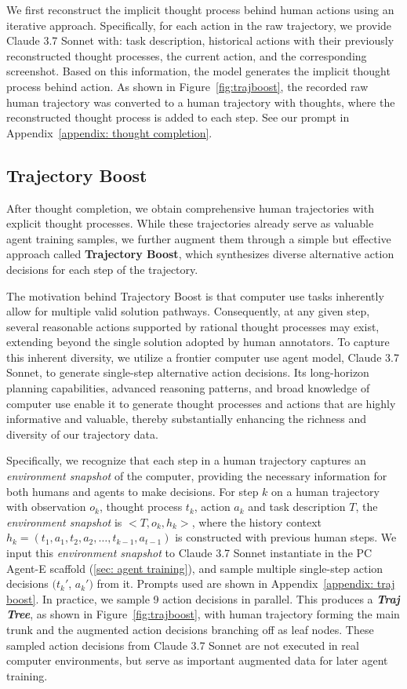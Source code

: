 \documentclass{article} %
\begin{document}
We first reconstruct the implicit thought process behind human actions using an iterative approach. Specifically, for each action in the raw trajectory, we provide Claude 3.7 Sonnet with: task description, historical actions with their previously reconstructed thought processes, the current action, and the corresponding screenshot. Based on this information, the model generates the implicit thought process behind action. As shown in Figure~\ref{fig:trajboost}, the recorded raw human trajectory was converted to a human trajectory with thoughts, where the reconstructed thought process is added to each step. See our prompt in Appendix~\ref{appendix: thought completion}.

\subsection{Trajectory Boost}
\label{sec:trajboost}

After thought completion, we obtain comprehensive human trajectories with explicit thought processes. While these trajectories already serve as valuable agent training samples, we further augment them through a simple but effective approach called \textbf{Trajectory Boost}, which synthesizes diverse alternative action decisions for each step of the trajectory.

The motivation behind Trajectory Boost is that computer use tasks inherently allow for multiple valid solution pathways. Consequently, at any given step, several reasonable actions supported by rational thought processes may exist, extending beyond the single solution adopted by human annotators. To capture this inherent diversity, we utilize a frontier computer use agent model, Claude 3.7 Sonnet, to generate single-step alternative action decisions. Its long-horizon planning capabilities, advanced reasoning patterns, and broad knowledge of computer use enable it to generate thought processes and actions that are highly informative and valuable, thereby substantially enhancing the richness and diversity of our trajectory data.

Specifically, we recognize that each step in a human trajectory captures an \textit{environment snapshot} of the computer, providing the necessary information for both humans and agents to make decisions. For step $k$ on a human trajectory with observation $o_k$, thought process $t_k$, action $a_k$ and task description $T$, the \textit{environment snapshot} is $<T,o_k, h_k>$, where the history context $h_k = (t_1, a_1, t_2, a_2, \dots, t_{k-1}, a_{t-1})$ is constructed with previous human steps. We input this \textit{environment snapshot} to Claude 3.7 Sonnet instantiate in the PC Agent-E scaffold (\autoref{sec: agent training}), and sample multiple single-step action decisions $(t_k'$, $a_k')$ from it. Prompts used are shown in Appendix~\ref{appendix: traj boost}. In practice, we sample 9 action decisions in parallel. This produces a \textbf{\textit{Traj Tree}}, as shown in Figure~\ref{fig:trajboost}, with human trajectory forming the main trunk and the augmented action decisions branching off as leaf nodes. These sampled action decisions from Claude 3.7 Sonnet are not executed in real computer environments, but serve as important augmented data for later agent training.
\end{document}
